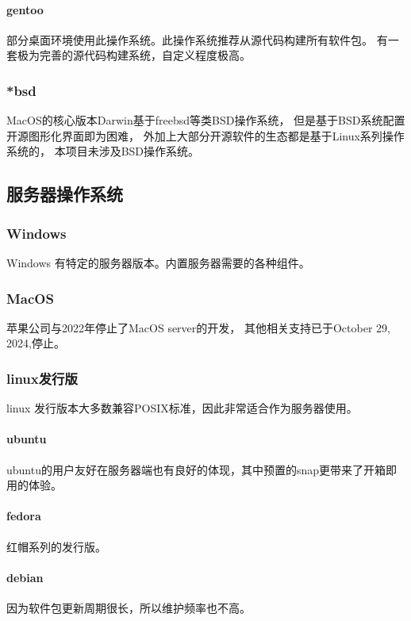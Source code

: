\paragraph{gentoo\cite{gentoo}}
部分桌面环境使用此操作系统。此操作系统推荐从源代码构建所有软件包。
有一套极为完善的源代码构建系统，自定义程度极高。

\subsubsection{*bsd}
MacOS的核心版本Darwin基于freebsd等类BSD操作系统，
但是基于BSD系统配置开源图形化界面即为困难，
外加上大部分开源软件的生态都是基于Linux系列操作系统的，
本项目未涉及BSD操作系统。

\subsection{服务器操作系统}

\subsubsection{Windows}
Windows 有特定的服务器版本。内置服务器需要的各种组件。

\subsubsection{MacOS}
苹果公司与2022年停止了MacOS server的开发，
其他相关支持已于October 29, 2024,停止。

\subsubsection{linux发行版}
linux 发行版本大多数兼容POSIX标准，因此非常适合作为服务器使用。

\paragraph{ubuntu}
ubuntu的用户友好在服务器端也有良好的体现，其中预置的snap更带来了开箱即用的体验。

\paragraph{fedora}
红帽系列的发行版。

\paragraph{debian}
因为软件包更新周期很长，所以维护频率也不高。

